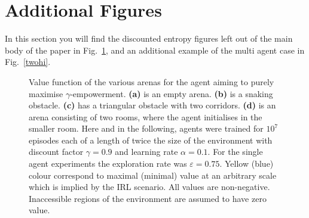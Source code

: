 \documentclass{article}
\begin{document}
\clearpage

\section{Additional Figures}
In this section you will find the discounted entropy figures left out of the main body of the paper in Fig.~\ref{empfigs}, and an additional example of the multi agent case in Fig.~\ref{twohi}.

\begin{figure}[!ht]
\centering
{}
\caption{Value function of the various arenas for the agent aiming to purely maximise $\gamma$-empowerment. 
\textbf{(a)} is an empty arena. \textbf{(b)} is a snaking obstacle. \textbf{(c)} has a triangular obstacle with two corridors. \textbf{(d)} is an arena consisting of two rooms, where the agent initialises in the smaller room.\label{empfigs}
Here and in the following, agents were trained for $10^7$ episodes each of a length of 
twice the size of the environment with discount factor $\gamma=0.9$ and 
learning rate $\alpha=0.1$. 
For the single agent experiments the exploration rate was $\varepsilon=0.75$. 
	Yellow (blue) colour correspond to maximal (minimal) value at an 
arbitrary scale which is implied by the IRL scenario. 
	All values are non-negative. Inaccessible regions of the environment 
are assumed to have zero value.}
\end{figure}
\end{document}
